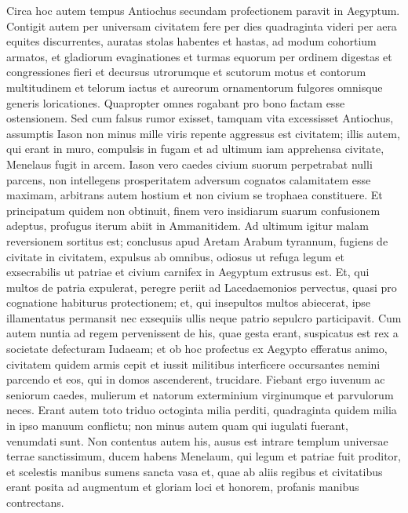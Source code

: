 \begin{biblechapter}
\begin{biblechapter}
\begin{biblechapter}
\begin{biblechapter}
\begin{biblechapter}
\verse Circa hoc autem tempus Antiochus secundam profectionem paravit in Aegyptum. 
\verse Contigit autem per universam civitatem fere per dies quadraginta videri per aera equites discurrentes, auratas stolas habentes et hastas, ad modum cohortium armatos, et gladiorum evaginationes 
\verse et turmas equorum per ordinem digestas et congressiones fieri et decursus utrorumque et scutorum motus et contorum multitudinem et telorum iactus et aureorum ornamentorum fulgores omnisque generis loricationes. 
\verse Quapropter omnes rogabant pro bono factam esse ostensionem.
 \verse Sed cum falsus rumor exisset, tamquam vita excessisset Antiochus, assumptis Iason non minus mille viris repente aggressus est civitatem; illis autem, qui erant in muro, compulsis in fugam et ad ultimum iam apprehensa civitate, Menelaus fugit in arcem. 
\verse Iason vero caedes civium suorum perpetrabat nulli parcens, non intellegens prosperitatem adversum cognatos calamitatem esse maximam, arbitrans autem hostium et non civium se trophaea constituere. 
\verse Et principatum quidem non obtinuit, finem vero insidiarum suarum confusionem adeptus, profugus iterum abiit in Ammanitidem. 
\verse Ad ultimum igitur malam reversionem sortitus est; conclusus apud Aretam Arabum tyrannum, fugiens de civitate in civitatem, expulsus ab omnibus, odiosus ut refuga legum et exsecrabilis ut patriae et civium carnifex in Aegyptum extrusus est. 
\verse Et, qui multos de patria expulerat, peregre periit ad Lacedaemonios pervectus, quasi pro cognatione habiturus protectionem; 
\verse et, qui insepultos multos abiecerat, ipse illamentatus permansit nec exsequiis ullis neque patrio sepulcro participavit.
 \verse Cum autem nuntia ad regem pervenissent de his, quae gesta erant, suspicatus est rex a societate defecturam Iudaeam; et ob hoc profectus ex Aegypto efferatus animo, civitatem quidem armis cepit 
\verse et iussit militibus interficere occursantes nemini parcendo et eos, qui in domos ascenderent, trucidare. 
\verse Fiebant ergo iuvenum ac seniorum caedes, mulierum et natorum exterminium virginumque et parvulorum neces. 
\verse Erant autem toto triduo octoginta milia perditi, quadraginta quidem milia in ipso manuum conflictu; non minus autem quam qui iugulati fuerant, venumdati sunt. 
\verse Non contentus autem his, ausus est intrare templum universae terrae sanctissimum, ducem habens Menelaum, qui legum et patriae fuit proditor, 
\verse et scelestis manibus sumens sancta vasa et, quae ab aliis regibus et civitatibus erant posita ad augmentum et gloriam loci et honorem, profanis manibus contrectans. 

\end{biblechapter}
\end{biblechapter}
\end{biblechapter}
\end{biblechapter}
\end{biblechapter}
